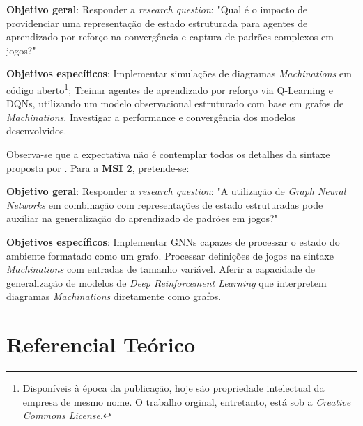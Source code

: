 \documentclass[10pt,a4paper]{article}
\begin{document}
\begin{outline}

	\1\textbf{Objetivo geral}:
	\2 Responder a \textit{research question}: "Qual é o impacto de providenciar uma representação de estado estruturada para agentes de aprendizado por reforço na convergência e captura de padrões complexos em jogos?"

	\1\textbf{Objetivos específicos}:
	 \2 Implementar simulações de diagramas \textit{Machinations} em código aberto\footnote{Disponíveis à época da publicação, hoje são propriedade intelectual da empresa de mesmo nome. O trabalho orginal, entretanto, está sob a \textit{Creative Commons License}.};
	 \2 Treinar agentes de aprendizado por reforço via Q-Learning e DQNs, utilizando um modelo observacional estruturado com base em grafos de \textit{Machinations}.
	 \2 Investigar a performance e convergência dos modelos desenvolvidos.

\end{outline}

Observa-se que a expectativa não é contemplar todos os detalhes da sintaxe proposta por \citeauthor{machinations}. Para a \textbf{MSI 2}, pretende-se:

\begin{outline}
	\1 \textbf{Objetivo geral}:
    \2 Responder a \textit{research question}: "A utilização de \textit{Graph Neural Networks} em combinação com representações de estado estruturadas pode auxiliar na generalização do aprendizado de padrões em jogos?"
	
	\1 \textbf{Objetivos específicos}:
	\2 Implementar GNNs capazes de processar o estado do ambiente formatado como um grafo.
	\2 Processar definições de jogos na sintaxe \textit{Machinations} com entradas de tamanho variável.
    \2 Aferir a capacidade de generalização de modelos de \textit{Deep Reinforcement Learning} que interpretem diagramas \textit{Machinations} diretamente como grafos.

\end{outline}

\section{Referencial Teórico}
\label{references}
\end{document}

